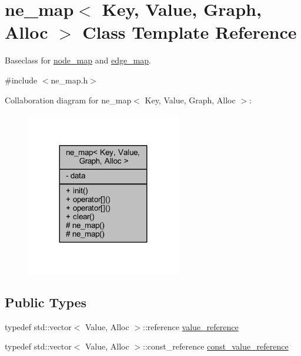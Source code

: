 \hypertarget{classne__map}{}\section{ne\+\_\+map$<$ Key, Value, Graph, Alloc $>$ Class Template Reference}
\label{classne__map}


Baseclass for \mbox{\hyperlink{classnode__map}{node\+\_\+map}} and \mbox{\hyperlink{classedge__map}{edge\+\_\+map}}.  




{\ttfamily \#include $<$ne\+\_\+map.\+h$>$}



Collaboration diagram for ne\+\_\+map$<$ Key, Value, Graph, Alloc $>$\+:\nopagebreak
\begin{figure}[H]
\begin{center}
\leavevmode
\includegraphics[width=191pt]{classne__map__coll__graph}
\end{center}
\end{figure}
\subsection*{Public Types}
\begin{DoxyCompactItemize}
\item 
typedef std\+::vector$<$ Value, Alloc $>$\+::reference \mbox{\hyperlink{classne__map_a3de60750d102f8992a215b0fe645014d}{value\+\_\+reference}}
\item 
typedef std\+::vector$<$ Value, Alloc $>$\+::const\+\_\+reference \mbox{\hyperlink{classne__map_ad2be1a01de53940aee1282ec0e34f0f7}{const\+\_\+value\+\_\+reference}}
\end{DoxyCompactItemize}
